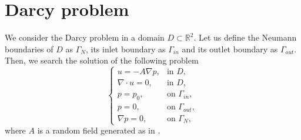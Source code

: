 \section{Darcy problem}
We consider the Darcy problem in a domain $D \subset \mathbb{R}^2$. Let us define the Neumann boundaries of $D$ as $\Gamma_N$, its inlet boundary as $\Gamma_{in}$ and its outlet boundary as $\Gamma_{out}$. Then, we search the solution of the following problem
\begin{equation}
	\label{eq:DarcyProblem}
	\begin{cases}
		u = -A \nabla p, & \text{in } D, \\
		\nabla\cdot u = 0, & \text{in } D, \\
		p = p_0, & \text{on } \Gamma_{in},\\
		p = 0, & \text{on } \Gamma_{out}, \\
		\nabla p = 0, & \text{on } \Gamma_N,
	\end{cases}
\end{equation}
where $A$ is a random field generated as in \cite{Nobile2015}.

